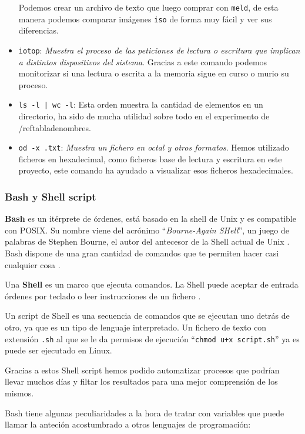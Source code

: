 \begin{itemize}
Podemos crear un archivo de texto que luego comprar con \verb|meld|, de esta manera podemos comparar imágenes \verb|iso| de forma muy fácil y ver sus diferencias.
\item \verb|iotop|: \textit{Muestra el proceso de las peticiones de lectura o escritura que implican a distintos dispositivos del sistema}.
Gracias a este comando podemos monitorizar si una lectura o escrita a la memoria sigue en curso o murio su proceso.
\item \verb=ls -l | wc -l=: Esta orden muestra la cantidad de elementos en un directorio, ha sido de mucha utilidad sobre todo en el experimento de /ref{tabladenombres}.
\item \verb|od -x .txt|: \textit{Muestra un fichero en octal y otros formatos}.
Hemos utilizado ficheros en hexadecimal, como ficheros base de lectura y escritura en este proyecto, este comando ha ayudado a visualizar esos ficheros hexadecimales.
\end{itemize}
\cite{manLinux}
\cite{ProgramacióndeShellScripts}

\subsubsection{Bash y Shell script}
\textbf{Bash} es un itérprete de órdenes, está basado en la shell de Unix y es compatible con POSIX. Su nombre viene del acrónimo ``\textit{Bourne-Again SHell}'', un juego de palabras de Stephen Bourne, el autor del antecesor de la Shell actual de Unix \cite{gnubash}. Bash dispone de una gran cantidad de comandos que te permiten hacer casi cualquier cosa \cite{indexbashcommand}.

Una \textbf{Shell} es un marco que ejecuta comandos. La Shell puede aceptar de entrada órdenes por teclado o leer instrucciones de un fichero \cite{gnubash}.

Un script de Shell es una secuencia de comandos que se ejecutan uno detrás de otro, ya que es un tipo de lenguaje interpretado. Un fichero de texto con extensión \verb|.sh| al que se le da permisos de ejecución ``\verb|chmod u+x script.sh|'' ya es puede ser ejecutado en Linux.

Gracias a estos Shell script hemos podido automatizar procesos que podrían llevar muchos días y filtar los resultados para una mejor comprensión de los mismos.

Bash tiene algunas peculiaridades a la hora de tratar con variables que puede llamar la anteción acostumbrado a otros lenguajes de programación:

